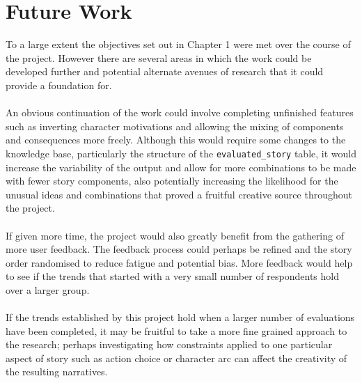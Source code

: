 \documentclass[letterpaper]{article}
\begin{document}
\section{Future Work}
To a large extent the objectives set out in Chapter 1 were met over the course of the project. However there are several areas in which the work could be developed further and potential alternate avenues of research that it could provide a foundation for.\\
\\An obvious continuation of the work could involve completing unfinished features such as inverting character motivations and allowing the mixing of components and consequences more freely. Although this would require some changes to the knowledge base, particularly the structure of the \texttt{evaluated\_story} table, it would increase the variability of the output and allow for more combinations to be made with fewer story components, also potentially increasing the likelihood for the unusual ideas and combinations that proved a fruitful creative source throughout the project.\\
\\If given more time, the project would also greatly benefit from the gathering of more user feedback. The feedback process could perhaps be refined and the story order randomised to reduce fatigue and potential bias. More feedback would help to see if the trends that started with a very small number of respondents hold over a larger group.\\
\\If the trends established by this project hold when a larger number of evaluations have been completed, it may be fruitful to take a more fine grained approach to the research; perhaps investigating how constraints applied to one particular aspect of story such as action choice or character arc can affect the creativity of the resulting narratives.\\
\end{document}
